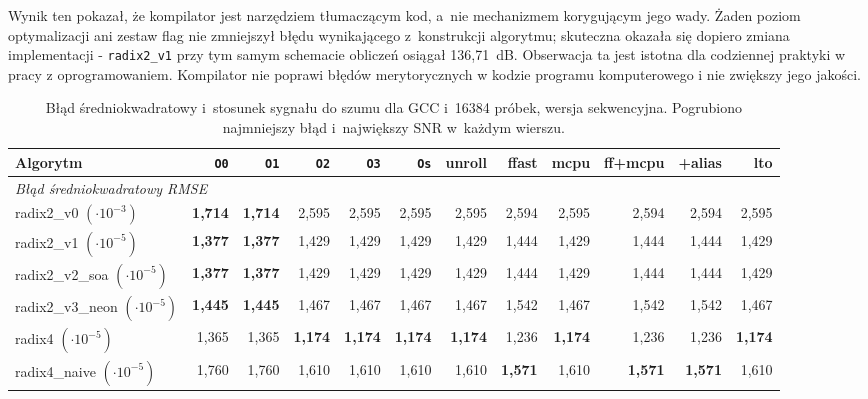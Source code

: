 Wynik ten pokazał, że kompilator jest narzędziem tłumaczącym kod, a~nie
mechanizmem korygującym jego wady. Żaden poziom optymalizacji ani zestaw flag nie
zmniejszył błędu wynikającego z~konstrukcji algorytmu; skuteczna okazała się
dopiero zmiana implementacji - \texttt{radix2\_v1} przy tym samym schemacie
obliczeń osiągał 136,71~dB. Obserwacja ta jest istotna dla codziennej praktyki w pracy z oprogramowaniem. 
Kompilator nie poprawi błędów merytorycznych w kodzie programu komputerowego i nie zwiększy jego jakości.
\begin{table}[H]
\centering
\caption{Błąd średniokwadratowy i~stosunek sygnału do szumu dla GCC i~16384 próbek, wersja sekwencyjna. Pogrubiono najmniejszy błąd i~największy SNR w~każdym wierszu.}
\label{tab:dokl-gcc-16k}
\scriptsize
\setlength{\tabcolsep}{3.0pt}
\begin{tabular}{lrrrrrrrrrrr}
\toprule
Algorytm & \texttt{O0} & \texttt{O1} & \texttt{O2} & \texttt{O3} & \texttt{Os} & unroll & ffast & mcpu & ff+mcpu & +alias & lto \\
\midrule
\multicolumn{12}{l}{\textit{Błąd średniokwadratowy RMSE}} \\[2pt]
radix2\_v0 $(\cdot 10^{-3})$ & \textbf{1,714} & \textbf{1,714} & 2,595 & 2,595 & 2,595 & 2,595 & 2,594 & 2,595 & 2,594 & 2,594 & 2,595 \\
radix2\_v1 $(\cdot 10^{-5})$ & \textbf{1,377} & \textbf{1,377} & 1,429 & 1,429 & 1,429 & 1,429 & 1,444 & 1,429 & 1,444 & 1,444 & 1,429 \\
radix2\_v2\_soa $(\cdot 10^{-5})$ & \textbf{1,377} & \textbf{1,377} & 1,429 & 1,429 & 1,429 & 1,429 & 1,444 & 1,429 & 1,444 & 1,444 & 1,429 \\
radix2\_v3\_neon $(\cdot 10^{-5})$ & \textbf{1,445} & \textbf{1,445} & 1,467 & 1,467 & 1,467 & 1,467 & 1,542 & 1,467 & 1,542 & 1,542 & 1,467 \\
radix4 $(\cdot 10^{-5})$ & 1,365 & 1,365 & \textbf{1,174} & \textbf{1,174} & \textbf{1,174} & \textbf{1,174} & 1,236 & \textbf{1,174} & 1,236 & 1,236 & \textbf{1,174} \\
radix4\_naive $(\cdot 10^{-5})$ & 1,760 & 1,760 & 1,610 & 1,610 & 1,610 & 1,610 & \textbf{1,571} & 1,610 & \textbf{1,571} & \textbf{1,571} & 1,610 \\

\end{tabular}
\end{table}
